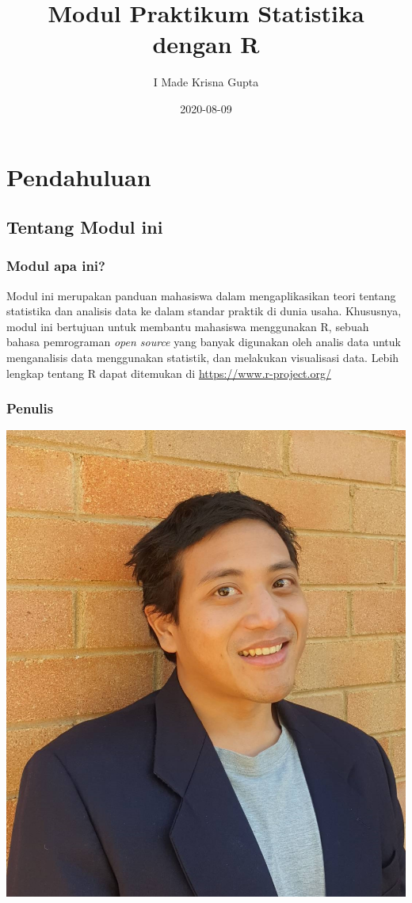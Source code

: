 \documentclass[
]{book}
\title{Modul Praktikum Statistika dengan R}
\author{I Made Krisna Gupta}
\date{2020-08-09}
\begin{document}
\maketitle

{
\setcounter{tocdepth}{1}
\tableofcontents
}
\hypertarget{pendahuluan}{%
\chapter{Pendahuluan}\label{pendahuluan}}

\hypertarget{tentang-modul-ini}{%
\section{Tentang Modul ini}\label{tentang-modul-ini}}

\hypertarget{modul-apa-ini}{%
\subsection{Modul apa ini?}\label{modul-apa-ini}}

Modul ini merupakan panduan mahasiswa dalam mengaplikasikan teori tentang statistika dan analisis data ke dalam standar praktik di dunia usaha. Khususnya, modul ini bertujuan untuk membantu mahasiswa menggunakan R, sebuah bahasa pemrograman \emph{open source} yang banyak digunakan oleh analis data untuk menganalisis data menggunakan statistik, dan melakukan visualisasi data. Lebih lengkap tentang R dapat ditemukan di \url{https://www.r-project.org/}

\hypertarget{penulis}{%
\subsection{Penulis}\label{penulis}}

\includegraphics{imedprofile.jpg}
\end{document}
